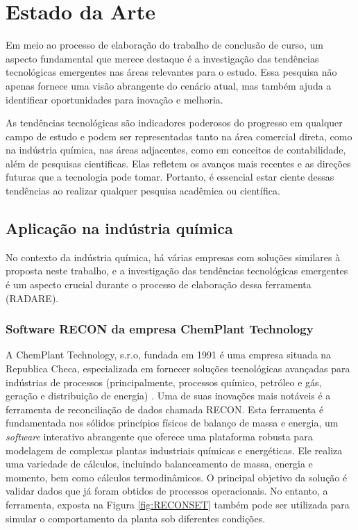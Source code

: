\section{Estado da Arte}

Em meio ao processo de elaboração do trabalho de conclusão de curso, um aspecto fundamental que merece destaque é a investigação das tendências tecnológicas emergentes nas áreas relevantes para o estudo. Essa pesquisa não apenas fornece uma visão abrangente do cenário atual, mas também ajuda a identificar oportunidades para inovação e melhoria.

As tendências tecnológicas são indicadores poderosos do progresso em qualquer campo de estudo e podem ser representadas tanto na área comercial direta, como na indústria química, nas áreas adjacentes, como em conceitos de contabilidade, além de pesquisas cientificas. Elas refletem os avanços mais recentes e as direções futuras que a tecnologia pode tomar. Portanto, é essencial estar ciente dessas tendências ao realizar qualquer pesquisa acadêmica ou científica.

\subsection{Aplicação na indústria química}

No contexto da indústria química, há várias empresas com soluções similares à proposta neste trabalho, e a investigação das tendências tecnológicas emergentes é um aspecto crucial durante o processo de elaboração dessa ferramenta (RADARE). 

\subsubsection{Software RECON da empresa ChemPlant Technology}

A ChemPlant Technology, s.r.o, fundada em 1991 é uma empresa situada na Republica Checa, especializada em fornecer soluções tecnológicas avançadas para indústrias de processos (principalmente, processos químico, petróleo e gás, geração e distribuição de energia) \cite{reconset}. Uma de suas inovações mais notáveis é a ferramenta de reconciliação de dados chamada RECON. Esta ferramenta é fundamentada nos sólidos princípios físicos de balanço de massa e energia, um \textit{software} interativo abrangente que oferece uma plataforma robusta para modelagem de complexas plantas industriais químicas e energéticas. Ele realiza uma variedade de cálculos, incluindo balanceamento de massa, energia e momento, bem como cálculos termodinâmicos. O principal objetivo da solução é validar dados que já foram obtidos de processos operacionais. No entanto, a ferramenta, exposta na Figura \ref{fig:RECONSET} também pode ser utilizada para simular o comportamento da planta sob diferentes condições.

